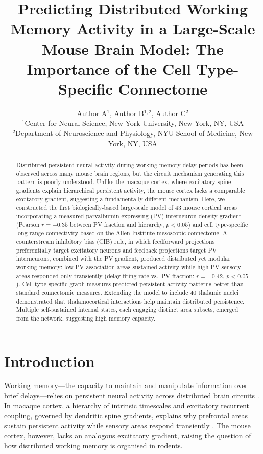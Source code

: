 \documentclass[11pt]{article}
\title{Predicting Distributed Working Memory Activity in a Large-Scale Mouse Brain Model: The Importance of the Cell Type-Specific Connectome}
\author{Author A$^{1}$, Author B$^{1,2}$, Author C$^{2}$\\
\small $^{1}$Center for Neural Science, New York University, New York, NY, USA\\
\small $^{2}$Department of Neuroscience and Physiology, NYU School of Medicine, New York, NY, USA}
\date{}
\begin{document}
\maketitle

\begin{abstract}
Distributed persistent neural activity during working memory delay periods has been observed across many mouse brain regions, but the circuit mechanism generating this pattern is poorly understood. Unlike the macaque cortex, where excitatory spine gradients explain hierarchical persistent activity, the mouse cortex lacks a comparable excitatory gradient, suggesting a fundamentally different mechanism. Here, we constructed the first biologically-based large-scale model of 43 mouse cortical areas incorporating a measured parvalbumin-expressing (PV) interneuron density gradient (Pearson $r = -0.35$ between PV fraction and hierarchy, $p < 0.05$) and cell type-specific long-range connectivity based on the Allen Institute mesoscopic connectome. A counterstream inhibitory bias (CIB) rule, in which feedforward projections preferentially target excitatory neurons and feedback projections target PV interneurons, combined with the PV gradient, produced distributed yet modular working memory: low-PV association areas sustained activity while high-PV sensory areas responded only transiently (delay firing rate vs.\ PV fraction: $r = -0.42$, $p < 0.05$). Cell type-specific graph measures predicted persistent activity patterns better than standard connectomic measures. Extending the model to include 40 thalamic nuclei demonstrated that thalamocortical interactions help maintain distributed persistence. Multiple self-sustained internal states, each engaging distinct area subsets, emerged from the network, suggesting high memory capacity.
\end{abstract}

\section{Introduction}

Working memory---the capacity to maintain and manipulate information over brief delays---relies on persistent neural activity across distributed brain circuits \citep{wang2001synaptic, goldman2003robust}. In macaque cortex, a hierarchy of intrinsic timescales and excitatory recurrent coupling, governed by dendritic spine gradients, explains why prefrontal areas sustain persistent activity while sensory areas respond transiently \citep{murray2014hierarchy, chaudhuri2015large}. The mouse cortex, however, lacks an analogous excitatory gradient, raising the question of how distributed working memory is organised in rodents.
\end{document}
